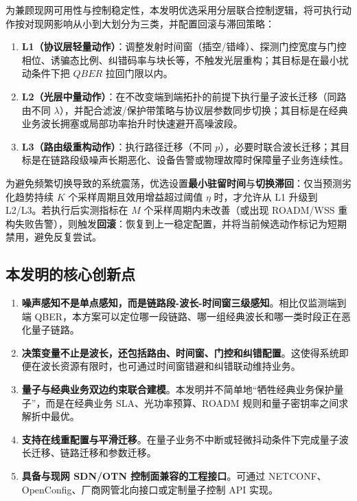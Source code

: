 \documentclass[12pt,a4paper]{article}
\begin{document}
为兼顾现网可用性与控制稳定性，本发明优选采用分层联合控制逻辑，将可执行动作按对现网影响从小到大划分为三类，并配置回滚与滞回策略：
\begin{enumerate}[label=(\arabic*)]
    \item \textbf{L1（协议层轻量动作）}：调整发射时间窗（插空/错峰）、探测门控宽度与门控相位、诱骗态比例、纠错码率与块长等，不触发光层重构；其目标是在最小扰动条件下把 $QBER$ 拉回门限以内。
    \item \textbf{L2（光层中量动作）}：在不改变端到端拓扑的前提下执行量子波长迁移（同路由不同 $\lambda$），并配合滤波/保护带策略与协议层参数同步切换；其目标是在经典业务波长拥塞或局部功率抬升时快速避开高噪波段。
    \item \textbf{L3（路由级重构动作）}：执行路径迁移（不同 $p$），必要时联合波长迁移；其目标是在链路段级噪声长期恶化、设备告警或物理故障时保障量子业务连续性。
\end{enumerate}

为避免频繁切换导致的系统震荡，优选设置\textbf{最小驻留时间}与\textbf{切换滞回}：仅当预测劣化趋势持续 $K$ 个采样周期且效用增益超过阈值 $\eta$ 时，才允许从 L1 升级到 L2/L3。若执行后实测指标在 $M$ 个采样周期内未改善（或出现 ROADM/WSS 重构失败告警），则触发\textbf{回滚}：恢复到上一稳定配置，并将当前候选动作标记为短期禁用，避免反复尝试。

\subsection{本发明的核心创新点}

\begin{enumerate}[label=(\arabic*)]
    \item \textbf{噪声感知不是单点感知，而是链路段-波长-时间窗三级感知}。相比仅监测端到端 QBER，本方案可以定位哪一段链路、哪一组经典波长和哪一类时段正在恶化量子链路。
    \item \textbf{决策变量不止是波长，还包括路由、时间窗、门控和纠错配置}。这使得系统即便在波长资源有限时，也可通过时间窗错避和纠错联动维持业务。
    \item \textbf{量子与经典业务双边约束联合建模}。本发明并不简单地“牺牲经典业务保护量子”，而是在经典业务 SLA、光功率预算、ROADM 规则和量子密钥率之间求解折中最优。
    \item \textbf{支持在线重配置与平滑迁移}。在量子业务不中断或轻微抖动条件下完成量子波长迁移、链路迁移和参数迁移。
    \item \textbf{具备与现网 SDN/OTN 控制面兼容的工程接口}。可通过 NETCONF、OpenConfig、厂商网管北向接口或定制量子控制 API 实现。
\end{enumerate}
\end{document}
